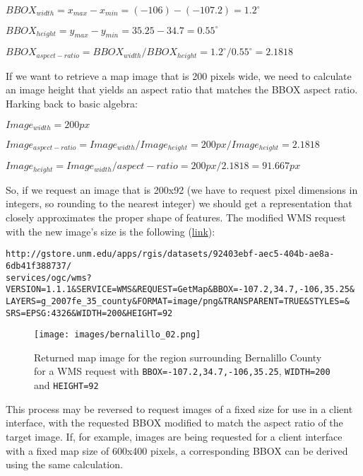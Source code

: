 \documentclass[]{book}
\begin{document}
\(BBOX_{width} = x_{max} - x_{min} = (-106) - (-107.2) = 1.2^{\circ}\)

\(BBOX_{height} = y_{max} - y_{min} = 35.25 - 34.7 = 0.55^{\circ}\)

\(BBOX_{aspect-ratio} = BBOX_{width} / BBOX_{height} = 1.2^{\circ} / 0.55^{\circ} = 2.1818\)

If we want to retrieve a map image that is 200 pixels wide, we need to
calculate an image height that yields an aspect ratio that matches the
BBOX aspect ratio. Harking back to basic algebra:

\(Image_{width} = 200px\)

\(Image_{aspect-ratio} = Image_{width} / Image_{height} = 200px / Image_{height} = 2.1818\)

\(Image_{height} = Image_{width} / {aspect-ratio} = 200px / 2.1818 = 91.667px\)

So, if we request an image that is 200x92 (we have to request pixel
dimensions in integers, so rounding to the nearest integer) we should
get a representation that closely approximates the proper shape of
features. The modified WMS request with the new image's size is the
following
(\href{http://gstore.unm.edu/apps/rgis/datasets/92403ebf-aec5-404b-ae8a-6db41f388737/services/ogc/wms?VERSION=1.1.1\&SERVICE=WMS\&REQUEST=GetMap\&BBOX=-107.2,34.7,-106,35.25\&LAYERS=g_2007fe_35_county\&FORMAT=image/png\&TRANSPARENT=TRUE\&STYLES=\&SRS=EPSG:4326\&WIDTH=200\&HEIGHT=92}{link}):

\begin{verbatim}
http://gstore.unm.edu/apps/rgis/datasets/92403ebf-aec5-404b-ae8a-6db41f388737/
services/ogc/wms?VERSION=1.1.1&SERVICE=WMS&REQUEST=GetMap&BBOX=-107.2,34.7,-106,35.25&
LAYERS=g_2007fe_35_county&FORMAT=image/png&TRANSPARENT=TRUE&STYLES=&
SRS=EPSG:4326&WIDTH=200&HEIGHT=92
\end{verbatim}

\begin{figure}[htbp]
\centering
\texttt{[image: images/bernalillo\_02.png]}
\caption{Returned map image for the region surrounding Bernalillo County
for a WMS request with \texttt{BBOX=-107.2,34.7,-106,35.25},
\texttt{WIDTH=200} and \texttt{HEIGHT=92}}
\end{figure}

This process may be reversed to request images of a fixed size for use
in a client interface, with the requested BBOX modified to match the
aspect ratio of the target image. If, for example, images are being
requested for a client interface with a fixed map size of 600x400
pixels, a corresponding BBOX can be derived using the same calculation.
\end{document}
